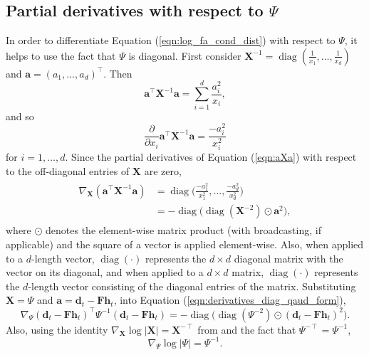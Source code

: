 \documentclass[msc,deptreport.inf]{infthesis} %
\newcommand{\matr}[1]{\mathbf{#1}}
\newcommand{\diag}{\mathop{\mathrm{diag}}}
\begin{document}
\subsection{Partial derivatives with respect to $\Psi$}

In order to differentiate Equation (\ref{eqn:log_fa_cond_dist}) with respect to $\Psi$, it helps to use the fact that $\Psi$ is diagonal. First consider $\matr{X}^{-1} = \diag(\frac{1}{x_1}, \dots, \frac{1}{x_d})$ and $\matr{a} = (a_1, \dots, a_d)^\intercal$. Then 
\begin{equation}\label{eqn:aXa}
	\matr{a}^\intercal \matr{X}^{-1} \matr{a} = \sum_{i=1}^d \frac{a_i^2}{x_i},
\end{equation}
and so
\begin{equation}
	\frac{\partial}{\partial x_i} \matr{a}^\intercal \matr{X}^{-1} \matr{a} = \frac{-a_i^2}{x_i^2}
\end{equation}
for $i=1, \dots, d$. Since the partial derivatives of Equation (\ref{eqn:aXa}) with respect to the off-diagonal entries of $\matr{X}$ are zero, 
\begin{align}\label{eqn:derivatives_diag_qaud_form}
\begin{split}
	\nabla_\matr{X} (\matr{a}^\intercal \matr{X}^{-1} \matr{a}) 
	& = \diag\Big({\frac{-a_1^2}{x_1^2}, \dots, \frac{-a_d^2}{x_d^2}}\Big) \\
	& = -\diag\big(\diag(\matr{X}^{-2}) \odot \matr{a}^2\big),
\end{split}
\end{align}  
where $\odot$ denotes the element-wise matrix product (with broadcasting, if applicable) and the square of a vector is applied element-wise. Also, when applied to a $d$-length vector, $\diag(\cdot)$ represents the $d \times d$ diagonal matrix with the vector on its diagonal, and when applied to a $d \times d$ matrix, $\diag(\cdot)$ represents the $d$-length vector consisting of the diagonal entries of the matrix. Substituting $\matr{X} = \Psi$ and $\matr{a} = \matr{d}_t - \matr{Fh}_t$, into Equation (\ref{eqn:derivatives_diag_qaud_form}),
\begin{equation}\label{eqn:derivatives_wrt_Psi_1}
	\nabla_\Psi (\matr{d}_t - \matr{Fh}_t)^\intercal \Psi^{-1} (\matr{d}_t - \matr{Fh}_t) 
	= -\diag\big(\diag(\Psi^{-2}) \odot (\matr{d}_t - \matr{Fh}_t)^2\big).
\end{equation}
Also, using the identity $\nabla_\matr{X} \log |\matr{X}| = \matr{X}^{-\intercal}$ from \cite{petersen2012} and the fact that $\Psi^{-\intercal} = \Psi^{-1}$, 
\begin{equation}\label{eqn:derivatives_wrt_Psi_2}
	\nabla_\Psi \log |\Psi|
	= \Psi^{-1}.
\end{equation}
\end{document}
